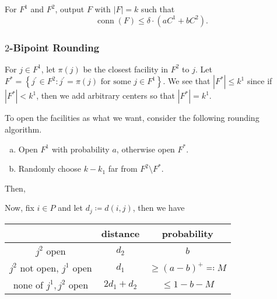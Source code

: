 \begin{remark}
	For \(F^1\) and \(F^2\), output \(F\) with \(\left\vert F \right\vert = k\) such that
	\[
		\mathop{\mathrm{conn}}(F) \leq \delta \cdot (a C^1 + b C^2).
	\]
\end{remark}

\subsubsection{\(2\)-Bipoint Rounding}
For \(j\in F^1\), let \(\pi (j)\)  be the closest facility in \(F^2\) to \(j\). Let \(F^{\ast} = \left\{ j^\prime \in F^2 \colon j^\prime =\pi (j) \text{ for some }j\in F^1  \right\} \). We see that \(\left\vert F^{\ast}  \right\vert \leq k^1\) since if \(\left\vert F^{\ast}  \right\vert < k^1\), then we add arbitrary centers so that \(\left\vert F^{\ast}  \right\vert = k^1\).

To open the facilities as what we want, consider the following rounding algorithm.
\begin{enumerate}[(a)]
	\item Open \(F^1\) with probability \(a\), otherwise open \(F^{\ast} \).
	\item Randomly choose \(k - k_1\) far from \(F^2 \setminus F^{\ast} \).
\end{enumerate}

Then,

Now, fix \(i\in P\) and let \(d_j \coloneqq d(i, j)\), then we have
\begin{table}[H]
	\centering
	\begin{tabular}{c|c|c}
		\toprule
		                               & distance       & probability                  \\
		\midrule
		\(j^2\) open                   & \(d_2\)        & \(b\)                        \\
		\(j^2\) not open, \(j^1\) open & \(d_1\)        & \(\geq (a-b)^+ \eqqcolon M\) \\
		none of \(j^1, j^2\) open      & \(2d_1 + d_2\) & \(\leq 1 - b - M\)           \\
		\bottomrule
	\end{tabular}
\end{table}

